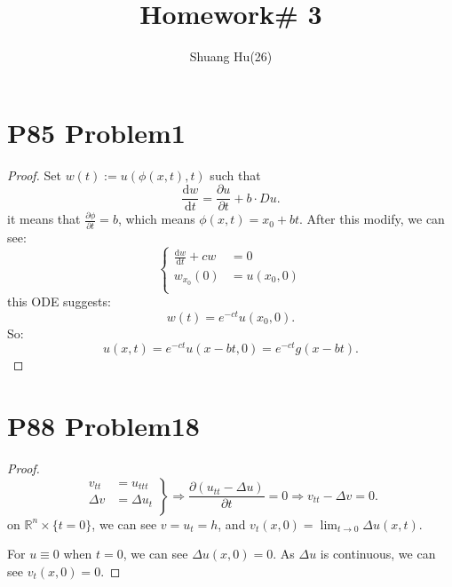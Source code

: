 \documentclass[a4paper]{ctexart}
\title{Homework\# 3}
\author{Shuang Hu(26)}
\newcommand{\dif}{\mathrm{d}}
\newcommand{\difFrac}[2]{\frac{\dif #1}{\dif #2}}
\newcommand{\pdfFrac}[2]{\frac{\partial #1}{\partial #2}}
\begin{document}
\maketitle
\section*{P85 Problem1}
\begin{proof}
    Set $w(t):=u(\phi(x,t),t)$ such that
    \begin{equation}
        \difFrac{w}{t}=\pdfFrac{u}{t}+b\cdot Du.
    \end{equation}
    it means that $\pdfFrac{\phi}{t}=b$, which means $\phi(x,t)=x_{0}+bt$. After this modify, 
    we can see:
    \begin{equation}
        \left\{
            \begin{aligned}
                \difFrac{w}{t}+cw&=0\\
                w_{x_{0}}(0)&=u(x_{0},0)\\
            \end{aligned}
        \right.
    \end{equation}
    this ODE suggests:
    \begin{equation}
        w(t)=e^{-ct}u(x_{0},0).
    \end{equation}
    So:
    \begin{equation}
        u(x,t)=e^{-ct}u(x-bt,0)=e^{-ct}g(x-bt).
    \end{equation}
\end{proof}
\section*{P88 Problem18}
\begin{proof}
    \begin{equation}
        \left.
            \begin{aligned}
                v_{tt}&=u_{ttt}\\
                \Delta v&=\Delta u_{t}\\
            \end{aligned}
        \right\}
        \Rightarrow\pdfFrac{(u_{tt}-\Delta u)}{t}=0\Rightarrow v_{tt}-\Delta v=0.
    \end{equation}
    on $\mathbb{R}^{n}\times\{t=0\}$, we can see $v=u_{t}=h$, and $v_{t}(x,0)=\lim_{t\rightarrow 0}\Delta u(x,t)$.

    For $u\equiv 0$ when $t=0$, we can see $\Delta u(x,0)=0$. As $\Delta u$ is continuous, we can see $v_{t}(x,0)=0$.
\end{proof}
\end{document}
